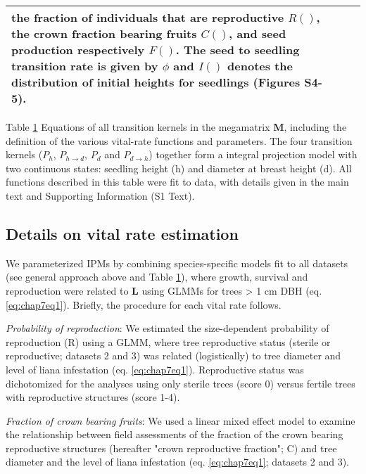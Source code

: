 \documentclass[b5paper,justified]{tufte-book} %
\begin{document}
\begin{fullwidth}
\begin{landscape}
\begin{table}
\begin{center}
\begin{tabular}{p{2.5cm}p{7.5cm}p{8.5cm}}
the fraction of individuals that are reproductive $R()$, the crown fraction bearing fruits $C()$, and seed production respectively $F()$. The seed to seedling transition rate is given by $\phi$ and $I()$ denotes the distribution of initial heights for seedlings (Figures S4-5).   
\\ 
\hline 
\end{tabular}
\label{tab:chap7tab1}
\hspace*{4cm} \begin{minipage}{20cm}
\footnotesize Table \ref{tab:chap7tab1} Equations of all transition kernels in the megamatrix \textbf{M}, including the definition of the various vital-rate functions and parameters. The four transition kernels ($P_{h}$, $P_{h \rightarrow d}$, $P_{d}$ and $P_{d \rightarrow h}$) together form a integral projection model with two continuous states: seedling height (h) and diameter at breast height (d). All functions described in this table were fit to data, with details given in the main text and Supporting Information (S1 Text).
\end{minipage}
\end{center}
\end{table}
\end{landscape}


\subsection{Details on vital rate estimation}
We parameterized IPMs by combining species-specific models fit to all datasets (see general approach above and Table \ref{tab:chap7tab1}), where growth, survival and reproduction were related to \textbf{L} using GLMMs for trees > 1 cm DBH (eq. \ref{eq:chap7eq1}). Briefly, the procedure for each vital rate follows.
  
\textit{Probability of reproduction}: We estimated the size-dependent probability of reproduction (R) using a GLMM, where tree reproductive status (sterile or reproductive; datasets 2 and 3) was related (logistically) to tree diameter and level of liana infestation (eq. \ref{eq:chap7eq1}). Reproductive status was dichotomized for the analyses using only sterile trees (score 0) versus fertile trees with reproductive structures (score 1-4).

\textit{Fraction of crown bearing fruits}: We used a linear mixed effect model to examine the relationship between field assessments of the fraction of the crown bearing reproductive structures (hereafter "crown reproductive fraction"; C) and tree diameter and the level of liana infestation (eq. \ref{eq:chap7eq1}; datasets 2 and 3).
 

\end{fullwidth}
\end{document}
